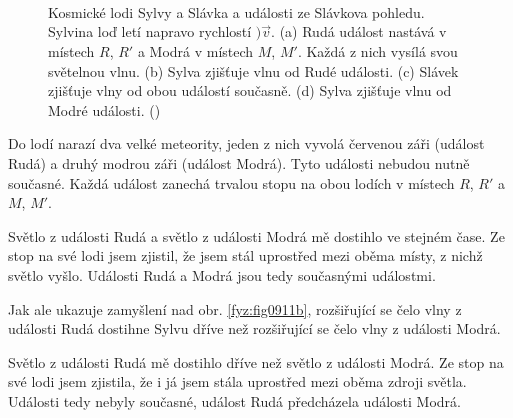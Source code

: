       \begin{figure}[ht!]  %
        \centering
         \\    
         \\   
         \\
        \caption{Kosmické lodi Sylvy a Slávka a události ze Slávkova pohledu. Sylvina loď letí
          napravo rychlostí \()\vec{v}\). (a) Rudá událost nastává v místech \(R\), \(R'\) a Modrá v
          místech \(M\), \(M'\). Každá z nich vysílá svou světelnou vlnu. (b) Sylva zjišťuje vlnu od
          Rudé události. (c) Slávek zjišťuje vlny od obou událostí současně. (d) Sylva zjišťuje vlnu
          od Modré události. (\cite[s.~1010]{Halliday2001})}
        \label{fyz:fig0911}
      \end{figure}
      
      Do lodí narazí dva velké meteority, jeden z nich vyvolá červenou záři (událost Rudá) a druhý
      modrou záři (událost Modrá). Tyto události nebudou nutně současné. Každá událost zanechá
      trvalou stopu na obou lodích v místech \(R\), \(R′\) a \(M\), \(M′\).

      \begin{description}[leftmargin=3em,labelindent=1em, style=nextline]
       \item [SLÁVEK řekne:] Světlo z události Rudá a světlo z události Modrá mě dostihlo ve stejném
             čase. Ze stop na své lodi jsem zjistil, že jsem stál uprostřed mezi oběma místy, z
             nichž světlo vyšlo. Události Rudá a Modrá jsou tedy současnými událostmi. 
      \end{description}
      
      Jak ale ukazuje zamyšlení nad obr. \ref{fyz:fig0911b}, rozšiřující se čelo vlny z události Rudá
      dostihne Sylvu dříve než rozšiřující se čelo vlny z události Modrá. 
      
      \begin{description}[leftmargin=3em,labelindent=1em, style=nextline]
        \item [SYLVA řekne:] Světlo z události Rudá mě dostihlo dříve než světlo z události Modrá.
              Ze stop na své lodi jsem zjistila, že i já jsem stála uprostřed mezi oběma zdroji
              světla. Události tedy nebyly současné, událost Rudá předcházela události Modrá. 
      \end{description}
        

